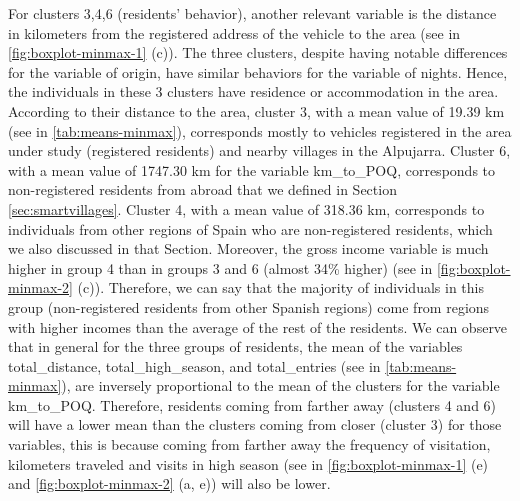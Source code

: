 For clusters 3,4,6 (residents' behavior), another relevant variable is the distance in kilometers from the registered address of the vehicle to the area (see in \cref{fig:boxplot-minmax-1} (c)). The three clusters, despite having notable differences for the variable of origin, have similar behaviors for the variable of nights. Hence, the individuals in these 3 clusters have residence or accommodation in the area. According to their distance to the area, cluster 3, with a mean value of 19.39 km (see in \cref{tab:means-minmax}), corresponds mostly to vehicles registered in the area under study (registered residents) and nearby villages in the Alpujarra. Cluster 6, with a mean value of 1747.30 km for the variable km\_to\_POQ, corresponds to non-registered residents from abroad that we defined in Section \ref{sec:smartvillages}. Cluster 4, with a mean value of 318.36 km, corresponds to individuals from other regions of Spain who are non-registered residents, which we also discussed in that Section. Moreover, the gross income variable is much higher in group 4 than in groups 3 and 6 (almost 34\% higher) (see in \cref{fig:boxplot-minmax-2} (c)). Therefore, we can say that the majority of individuals in this group (non-registered residents from other Spanish regions) come from regions with higher incomes than the average of the rest of the residents. We can observe that in general for the three groups of residents, the mean of the variables total\_distance, total\_high\_season, and total\_entries (see in \cref{tab:means-minmax}), are inversely proportional to the mean of the clusters for the variable km\_to\_POQ. Therefore, residents coming from farther away (clusters 4 and 6) will have a lower mean than the clusters coming from closer (cluster 3) for those variables, this is because coming from farther away the frequency of visitation, kilometers traveled and visits in high season (see in \cref{fig:boxplot-minmax-1} (e) and \cref{fig:boxplot-minmax-2} (a, e)) will also be lower.


